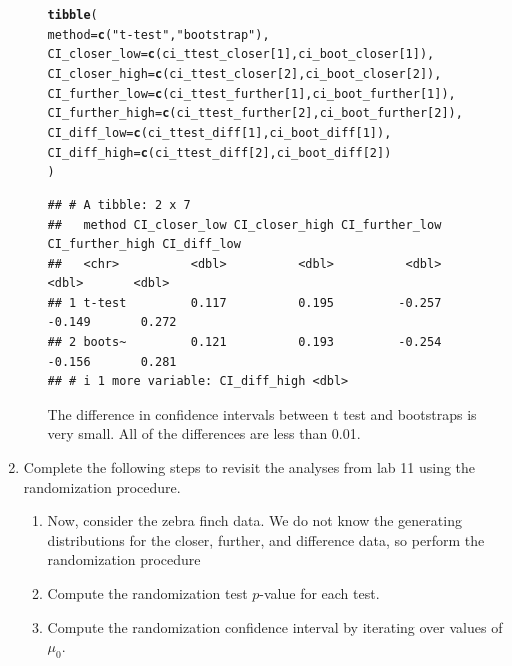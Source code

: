 \documentclass{article}\usepackage[]{graphicx}\usepackage[]{xcolor}
\makeatletter
\newcommand{\hlnum}[1]{\textcolor[rgb]{0.686,0.059,0.569}{#1}}%
\newcommand{\hlsng}[1]{\textcolor[rgb]{0.192,0.494,0.8}{#1}}%
\newcommand{\hldef}[1]{\textcolor[rgb]{0.345,0.345,0.345}{#1}}%
\newcommand{\hlkwc}[1]{\textcolor[rgb]{0.333,0.667,0.333}{#1}}%
\newcommand{\hlkwd}[1]{\textcolor[rgb]{0.737,0.353,0.396}{\textbf{#1}}}%
\newenvironment{kframe}{%
 \def\at@end@of@kframe{}%
 \ifinner\ifhmode%
  \def\at@end@of@kframe{\end{minipage}}%
  \begin{minipage}{\columnwidth}%
 \fi\fi%
 \def\FrameCommand##1{\hskip\@totalleftmargin \hskip-\fboxsep
 \colorbox{shadecolor}{##1}\hskip-\fboxsep
     \hskip-\linewidth \hskip-\@totalleftmargin \hskip\columnwidth}%
 \MakeFramed {\advance\hsize-\width
   \@totalleftmargin\z@ \linewidth\hsize
   \@setminipage}}%
 {\par\unskip\endMakeFramed%
 \at@end@of@kframe}
\newenvironment{knitrout}{}{} %
\makeatother
\begin{document}
\begin{enumerate}
\begin{enumerate}
\begin{knitrout}
\begin{kframe}
\begin{alltt}
\hlkwd{tibble}\hldef{(}
  \hlkwc{method} \hldef{=} \hlkwd{c}\hldef{(}\hlsng{"t-test"}\hldef{,} \hlsng{"bootstrap"}\hldef{),}
  \hlkwc{CI_closer_low} \hldef{=} \hlkwd{c}\hldef{(ci_ttest_closer[}\hlnum{1}\hldef{], ci_boot_closer[}\hlnum{1}\hldef{]),}
  \hlkwc{CI_closer_high} \hldef{=} \hlkwd{c}\hldef{(ci_ttest_closer[}\hlnum{2}\hldef{], ci_boot_closer[}\hlnum{2}\hldef{]),}
  \hlkwc{CI_further_low} \hldef{=} \hlkwd{c}\hldef{(ci_ttest_further[}\hlnum{1}\hldef{], ci_boot_further[}\hlnum{1}\hldef{]),}
  \hlkwc{CI_further_high} \hldef{=} \hlkwd{c}\hldef{(ci_ttest_further[}\hlnum{2}\hldef{], ci_boot_further[}\hlnum{2}\hldef{]),}
  \hlkwc{CI_diff_low} \hldef{=} \hlkwd{c}\hldef{(ci_ttest_diff[}\hlnum{1}\hldef{], ci_boot_diff[}\hlnum{1}\hldef{]),}
  \hlkwc{CI_diff_high} \hldef{=} \hlkwd{c}\hldef{(ci_ttest_diff[}\hlnum{2}\hldef{], ci_boot_diff[}\hlnum{2}\hldef{])}
\hldef{)}
\end{alltt}
\begin{verbatim}
## # A tibble: 2 x 7
##   method CI_closer_low CI_closer_high CI_further_low CI_further_high CI_diff_low
##   <chr>          <dbl>          <dbl>          <dbl>           <dbl>       <dbl>
## 1 t-test         0.117          0.195         -0.257          -0.149       0.272
## 2 boots~         0.121          0.193         -0.254          -0.156       0.281
## # i 1 more variable: CI_diff_high <dbl>
\end{verbatim}
\end{kframe}
\end{knitrout}
The difference in confidence intervals between t test and bootstraps is very small. All of the differences are less than 0.01. 
\end{enumerate}
\item Complete the following steps to revisit the analyses from lab 11 using the
randomization procedure.
\begin{enumerate}
\item Now, consider the zebra finch data. We do not know the generating distributions
for the closer, further, and difference data, so perform the randomization procedure
  \item Compute the randomization test $p$-value for each test.
  \item Compute the randomization confidence interval by iterating over values of $\mu_0$.\\

\end{enumerate}
\end{enumerate}
\end{document}
